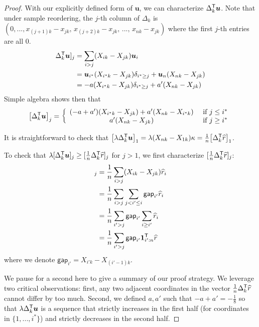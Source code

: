\begin{proof}
With our explicitly defined form of $\mathbf{u}$, we can characterize $\Delta_k^{\mathsf{T}} \mbox{\boldmath $u$}$. Note that under sample reordering, the $j$-th column of $\Delta_k$ is $(0, ..., x_{(j+1)k} - x_{jk},\, x_{(j+2)k} - x_{jk},\, ...,\, x_{nk} - x_{jk} )$ where the first $j$-th entries are all 0. 
\begin{align*}
\Delta_k^{\mathsf{T}} \mbox{\boldmath $u$}]_j &= \sum_{i > j} (X_{ik} - X_{jk}) \mbox{\boldmath $u$}_i \\
  &= \mbox{\boldmath $u$}_{i^*} (X_{i^*k} - X_{jk}) \delta_{i^* \geq j} + \mbox{\boldmath $u$}_n (X_{nk} - X_{jk})\\ 
  &= -a (X_{i^*k} - X_{jk}) \delta_{i^* \geq j} + a' (X_{nk} - X_{jk}) \\
\end{align*}
Simple algebra shows then that
\begin{align}
\big[ \Delta_k^{\mathsf{T}} \mbox{\boldmath $u$} \big]_j = 
  \left \{ \begin{array}{cc} 
   (-a + a')(X_{i^*k} - X_{jk})+ a'(X_{nk} - X_{ i^*k})
   & \textrm{ if } j \leq i^* \\
   a'(X_{nk} - X_{jk}) & \textrm{ if } j \geq i^* 
     \end{array} \right.
\end{align} 

It is straightforward to check that $\big[ \lambda \Delta_k^{\mathsf{T}} \mbox{\boldmath $u$} \big]_1 = \lambda (X_{nk} - X_{1k}) \kappa = \frac{1}{n} \big[ \Delta_k^{\mathsf{T}} \widehat{r} \big]_1$.

To check that $\lambda [ \Delta_k^{\mathsf{T}} \mbox{\boldmath $u$} ]_j \geq [ \frac{1}{n} \Delta_k^{\mathsf{T}} \widehat{r}]_j$ for $j > 1$, we first characterize $[\frac{1}{n} \Delta_k^{\mathsf{T}} \widehat{r}]_j$:
\begin{align*}
[\frac{1}{n} \Delta_k^\tran \hat{r}]_j &= \frac{1}{n} \sum_{i > j} (X_{ik} - X_{jk}) \hat{r}_i \\
  & = \frac{1}{n} \sum_{i > j} \sum_{j < i' \leq i} \mathsf{gap}_{i'} \hat{r}_i \\
 & = \frac{1}{n} \sum_{i' > j} \mathsf{gap}_{i'} \sum_{i \geq i'} \hat{r}_i \\
 & = \frac{1}{n} \sum_{i' > j} \mathsf{gap}_{i'} \mathbf{1}_{i':n}^\tran \hat{r} 
\end{align*}
where we denote $\mathsf{gap}_{i'} = X_{i'k} - X_{(i'-1)k}$.

We pause for a second here to give a summary of our proof strategy. We leverage two critical observations: first, any two adjacent coordinates in the vector $\frac{1}{n} \Delta_k^{\mathsf{T}} \widehat{r}$ cannot differ by too much. Second, we defined $a, a'$ such that $-a+a' = -\frac{1}{8}$ so that $\lambda \Delta_k^{\mathsf{T}} \mbox{\boldmath $u$}$ is a sequence that strictly increases in the first half (for coordinates in $\{1,...,i^*\}$) and strictly decreases in the second half. 


\end{proof}
